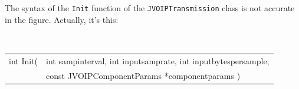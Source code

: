			The syntax of the {\tt Init} function of the {\tt JVOIPTransmission} class is
			not accurate in the figure. Actually, it's this:
			\begin{center}
				{\tt
				\begin{tabular}{rl}
				int Init(&int sampinterval, int inputsamprate, int inputbytespersample,\\
				&const JVOIPComponentParams *componentparams )\\
				\end{tabular}
				}
			\end{center}
